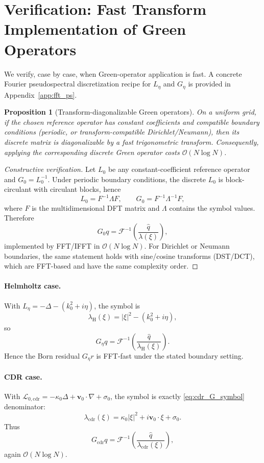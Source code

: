 \documentclass{article}
\theoremstyle{plain}
\newtheorem{proposition}{Proposition}[section]
\theoremstyle{remark}
\begin{document}
\section{Verification: Fast Transform Implementation of Green Operators}
\label{app:fft_verify_all}
We verify, case by case, when Green-operator application is fast. A concrete Fourier pseudospectral discretization recipe for $L_\eta$ and $G_\eta$ is provided in Appendix~\ref{app:fft_ps}.

\begin{proposition}[Transform-diagonalizable Green operators]
\label{prop:fft_all_cases}
On a uniform grid, if the chosen reference operator has constant coefficients and compatible boundary conditions (periodic, or transform-compatible Dirichlet/Neumann), then its discrete matrix is diagonalizable by a fast trigonometric transform. Consequently, applying the corresponding discrete Green operator costs $\mathcal{O}(N\log N)$.
\end{proposition}

\begin{proof}[Constructive verification]
Let $L_0$ be any constant-coefficient reference operator and $G_0=L_0^{-1}$. Under periodic boundary conditions, the discrete $L_0$ is block-circulant with circulant blocks, hence
\[
L_0 = F^{-1}\Lambda F,\qquad
G_0 = F^{-1}\Lambda^{-1}F,
\]
where $F$ is the multidimensional DFT matrix and $\Lambda$ contains the symbol values. Therefore
\[
G_0 q = \mathcal{F}^{-1}\!\left(\frac{\widehat{q}}{\lambda(\xi)}\right),
\]
implemented by FFT/IFFT in $\mathcal{O}(N\log N)$.
For Dirichlet or Neumann boundaries, the same statement holds with sine/cosine transforms (DST/DCT), which are FFT-based and have the same complexity order.
\end{proof}

\paragraph{Helmholtz case.}
With $L_\eta=-\Delta-(k_0^2+i\eta)$, the symbol is
\[
\lambda_{\mathrm{H}}(\xi)=|\xi|^2-(k_0^2+i\eta),
\]
so
\[
G_\eta q = \mathcal{F}^{-1}\!\left(\frac{\widehat{q}}{\lambda_{\mathrm{H}}(\xi)}\right).
\]
Hence the Born residual $G_\eta r$ is FFT-fast under the stated boundary setting.

\paragraph{CDR case.}
With $\mathcal{L}_{0,\mathrm{cdr}}=-\kappa_0\Delta+\mathbf{v}_0\cdot\nabla+\sigma_0$, the symbol is exactly \eqref{eq:cdr_G_symbol} denominator:
\[
\lambda_{\mathrm{cdr}}(\xi)=\kappa_0|\xi|^2+i\mathbf{v}_0\cdot\xi+\sigma_0.
\]
Thus
\[
G_{\mathrm{cdr}} q = \mathcal{F}^{-1}\!\left(\frac{\widehat{q}}{\lambda_{\mathrm{cdr}}(\xi)}\right),
\]
again $\mathcal{O}(N\log N)$.
\end{document}
